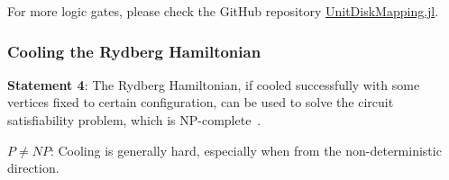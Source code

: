 \documentclass[twocolumn,superscriptaddress,english,showpacs,longbibliography]{revtex4-2}
\begin{document}
For more logic gates, please check the GitHub repository
\href{https://github.com/QuEraComputing/UnitDiskMapping.jl/blob/main/test/logicgates.jl}{UnitDiskMapping.jl}.

\subsubsection{Cooling the Rydberg Hamiltonian}\label{cooling-the-rydberg-hamiltonian}

\textbf{Statement 4}: The Rydberg Hamiltonian, if cooled successfully
with some vertices fixed to certain configuration, can be used to solve
the circuit satisfiability problem, which is NP-complete~\cite{Moore2011}.

$P \neq NP$: Cooling is generally hard, especially when from the
non-deterministic direction.
\end{document}
